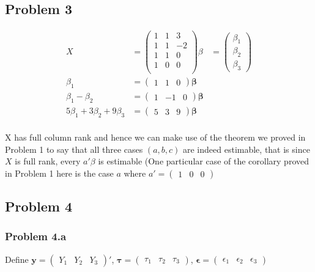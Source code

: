 \documentclass[a4paper]{article}
\begin{document}
\subsection*{Problem 3}
\begin{align*}
X &= \begin{pmatrix}
1 & 1 & 3\\
1 & 1 & -2\\
1 & 1 & 0\\
1 & 0 & 0\\
\end{pmatrix}
\beta & = \begin{pmatrix}
\beta_1\\
\beta_2\\
\beta_3
\end{pmatrix}\\
\beta_1 & = \begin{pmatrix}1 & 1 & 0\end{pmatrix}\mathbf{\beta}\\
\beta_1-\beta_2 &= \begin{pmatrix}1 &-1 & 0\end{pmatrix}\mathbf{\beta}\\
5\beta_1+3\beta_2+9\beta_3 &= \begin{pmatrix}5 & 3& 9\end{pmatrix}\mathbf{\beta}\\
\end{align*}

X has full column rank and hence we can make use of the theorem we proved in Problem 1 to say that all three cases $(a,b,c)$ are indeed estimable, that is since $X$ is full rank, every $a'\beta$ is estimable (One particular case of the corollary proved in Problem 1 here is the case $a$ where $a'=\begin{pmatrix}1 & 0 & 0\end{pmatrix}$
\subsection*{Problem 4}
\subsubsection*{Problem 4.a}
Define $\mathbf{y}=\begin{pmatrix}Y_1 & Y_2 &  Y_3\end{pmatrix}'$, $\mathbf{\tau} = \begin{pmatrix} \tau_1 & \tau_2 & \tau_3 \end{pmatrix}$, $\mathbf{\epsilon} = \begin{pmatrix}\epsilon_1 & \epsilon_2 & \epsilon_3\end{pmatrix}$
\end{document}
